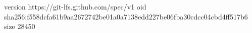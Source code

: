 version https://git-lfs.github.com/spec/v1
oid sha256:f558dcfa61b9aa2672742be01a0a7138edd227be06fba30cdcc04cbd4ff517b6
size 28450
